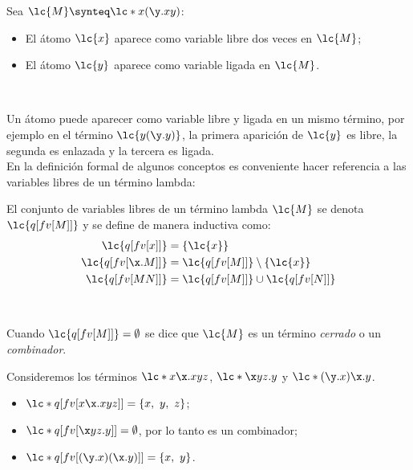 \begin{ejemplo} Sea \(\lc{M} \synteq \lc*{x(\y.x y)}\):
  \begin{itemize}
  \item El átomo \(\lc{x}\) aparece como variable libre dos veces en \(\lc{M}\);
  \item El átomo \(\lc{y}\) aparece como variable ligada en \(\lc{M}\).
  \end{itemize}
\end{ejemplo} \

Un átomo puede aparecer como variable libre y ligada en un mismo término, por ejemplo en el término \(\lc{y(\y.y)}\), la primera aparición de \(\lc{y}\) es libre, la segunda es enlazada y la tercera es ligada. \\

En la definición formal de algunos conceptos es conveniente hacer referencia a las variables libres de un término lambda: \\

\begin{defi} El conjunto de variables libres de un término lambda \(\lc{M}\) se denota \(\lc{q[fv[M]]}\) y se define de manera inductiva como:
  \label{definicion:variableslibres}
  \begin{align*}
    \lc{q[fv[x]]} &= \left\{ \lc{x} \right\} \\
    \lc{q[fv[\x.M]]} &= \lc{q[fv[M]]} \setminus \left\{ \lc{x} \right\} \\
    \lc{q[fv[M N]]} &= \lc{q[fv[M]]} \cup \lc{q[fv[N]]}
  \end{align*}
\end{defi} \

Cuando \(\lc{q[fv[M]]}=\emptyset\) se dice que \(\lc{M}\) es un término \emph{cerrado} o un \emph{combinador}. \\

\begin{ejemplo} Consideremos los términos \(\lc*{x\x.x y z}\), \(\lc*{\x y
    z.y}\) y \(\lc*{(\y.x)\x.y}\).
  \begin{itemize}
  \item \(\lc*{q[fv[x \x.x y z]]} = \left\{ x,\ y,\ z \right\}\);
  \item \(\lc*{q[fv[\x y z.y]]} = \emptyset\), por lo tanto es un combinador;
  \item \(\lc*{q[fv[(\y.x)(\x.y)]]}=\left\{ x,\ y \right\}\).
  \end{itemize}
\end{ejemplo} \

